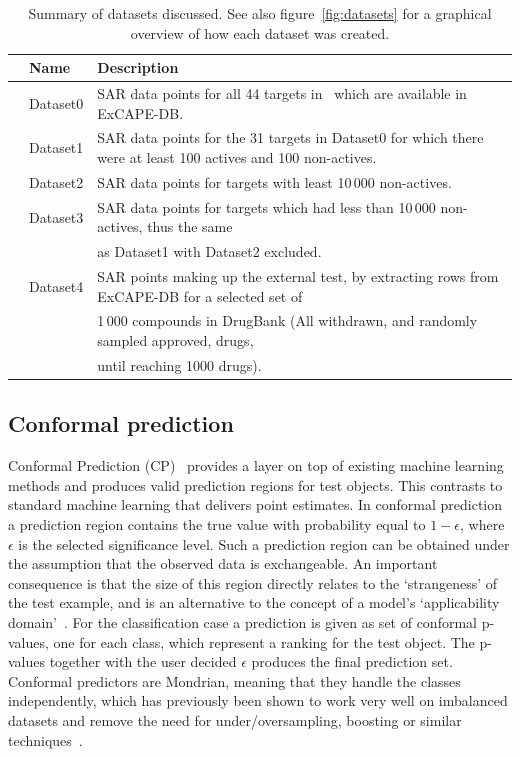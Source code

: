 \documentclass[utf8]{frontiersSCNS} %
\begin{document}
\begin{table}[h]
\small
\centering
\caption{Summary of datasets discussed. See also figure~\ref{fig:datasets}
    for a graphical overview of how each dataset was created.}
\label{tbl:datasets}
\renewcommand{\arraystretch}{1.4}
\begin{tabular}{rlp{}}
\toprule
& Name     & Description \\
\midrule
& Dataset0 & SAR data points for all 44 targets in~\cite{Bowes2012} which are available in ExCAPE-DB. \\
& Dataset1 & SAR data points for the 31 targets in Dataset0 for which there were at least 100 actives and 100 non-actives. \\
& Dataset2 & SAR data points for targets with least 10\,000 non-actives. \\
& Dataset3 & SAR data points for targets which had less than 10\,000 non-actives, thus the same \\
&          & as Dataset1 with Dataset2 excluded. \\
& Dataset4 & SAR points making up the external test, by extracting rows from ExCAPE-DB for a selected set of \\
&          & 1\,000 compounds in DrugBank (All withdrawn, and randomly sampled approved, drugs,\\
&          & until reaching 1000 drugs). \\
\bottomrule
\end{tabular}
\renewcommand{\arraystretch}{1}
\end{table}

\subsection{Conformal prediction}
Conformal Prediction (CP)~\cite{Vovk2005} provides a layer on top of
existing machine learning methods and produces valid prediction regions for test
objects. This contrasts to standard machine learning that delivers point
estimates. In conformal prediction a prediction region contains the true
value with probability equal to $1-\epsilon$, where $\epsilon$ is the selected significance level. Such
a prediction region can be obtained under the assumption that the observed data
is exchangeable. An important consequence is that the size of this region directly
relates to the `strangeness' of the test example, and is an alternative to the
concept of a model's `applicability domain'~\cite{Norinder:2014fe}. For the classification 
case a prediction is given as set of conformal p-values, one for each class,
which represent a ranking for the test object. The p-values together with the user decided $\epsilon$
produces the final prediction set. Conformal predictors are Mondrian, meaning that they handle
the classes independently, which has previously been shown to work very well on imbalanced datasets and remove
the need for under/oversampling, boosting or similar techniques~\cite{Norinder:2017qc,Sun:2017qm}.
\end{document}
